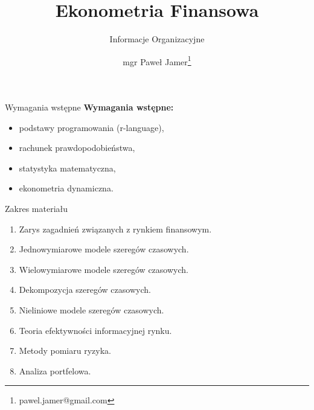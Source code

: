 \documentclass[a4paper, 11pt]{beamer}
\title{Ekonometria Finansowa}
\subtitle{Informacje Organizacyjne}
\author{mgr Paweł Jamer\thanks{pawel.jamer@gmail.com}}
\begin{document}
	\begin{frame}
		\titlepage
	\end{frame}

	\begin{frame}{Wymagania wstępne}
		\textbf{Wymagania wstępne:}
		\begin{itemize}
			\item podstawy programowania (r-language),
			\item rachunek prawdopodobieństwa,
			\item statystyka matematyczna,
			\item ekonometria dynamiczna.
		\end{itemize}
	\end{frame}
	
	\begin{frame}{Zakres materiału}
		\begin{enumerate}
			\item Zarys zagadnień związanych z rynkiem finansowym.
			\item Jednowymiarowe modele szeregów czasowych.
			\item Wielowymiarowe modele szeregów czasowych.
			\item Dekompozycja szeregów czasowych.
			\item Nieliniowe modele szeregów czasowych.
			\item Teoria efektywności informacyjnej rynku.
			\item Metody pomiaru ryzyka.
			\item Analiza portfelowa.
		\end{enumerate}
	\end{frame}
	
\end{document}
